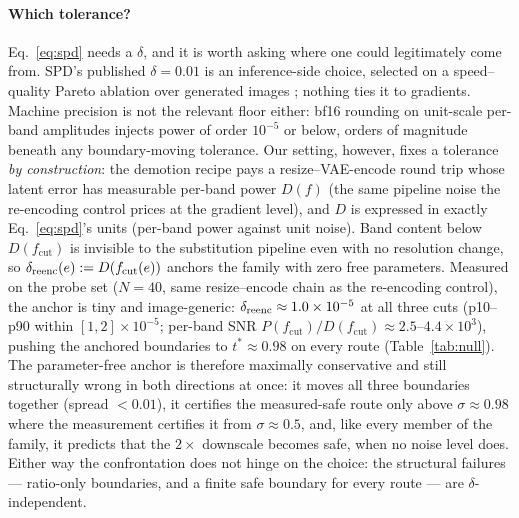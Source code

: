 \paragraph{Which tolerance?}
Eq.~\ref{eq:spd} needs a $\delta$, and it is worth asking where one could
legitimately come from. SPD's published $\delta = 0.01$ is an
inference-side choice, selected on a speed--quality Pareto ablation over
generated images \citep{xiao2026spd}; nothing ties it to gradients.
Machine precision is not the relevant floor either: bf16 rounding on
unit-scale per-band amplitudes injects power of order $10^{-5}$ or below,
orders of magnitude beneath any boundary-moving tolerance. Our setting,
however, fixes a tolerance \emph{by construction}: the demotion recipe
pays a resize--VAE-encode round trip whose latent error has measurable
per-band power $D(f)$ (the same pipeline noise the re-encoding control
prices at the gradient level), and $D$ is expressed in exactly
Eq.~\ref{eq:spd}'s units (per-band power against unit noise). Band
content below $D(f_{\mathrm{cut}})$ is invisible to the substitution
pipeline even with no resolution change, so
$\delta_{\mathrm{reenc}}(e) := D(f_{\mathrm{cut}}(e))$ anchors the family with zero
free parameters. Measured on the probe set ($N{=}40$, same
resize--encode chain as the re-encoding control), the anchor is tiny
and image-generic: $\delta_{\mathrm{reenc}} \approx 1.0\times10^{-5}$ at all
three cuts (p10--p90 within $[1, 2]\times10^{-5}$; per-band SNR
$P(f_{\mathrm{cut}})/D(f_{\mathrm{cut}}) \approx 2.5$--$4.4\times10^{3}$),
pushing the anchored boundaries to $t^{*} \approx 0.98$ on every route
(Table~\ref{tab:null}). The parameter-free anchor is therefore maximally
conservative and still structurally wrong in both directions at once:
it moves all three boundaries together (spread $< 0.01$), it certifies
the measured-safe route only above $\sigma \approx 0.98$ where the
measurement certifies it from $\sigma \approx 0.5$, and, like every
member of the family, it predicts that the $2\times$ downscale becomes
safe, when no noise level does. Either way the confrontation does not
hinge on the choice: the structural failures --- ratio-only
boundaries, and a finite safe boundary for every route --- are
$\delta$-independent.

